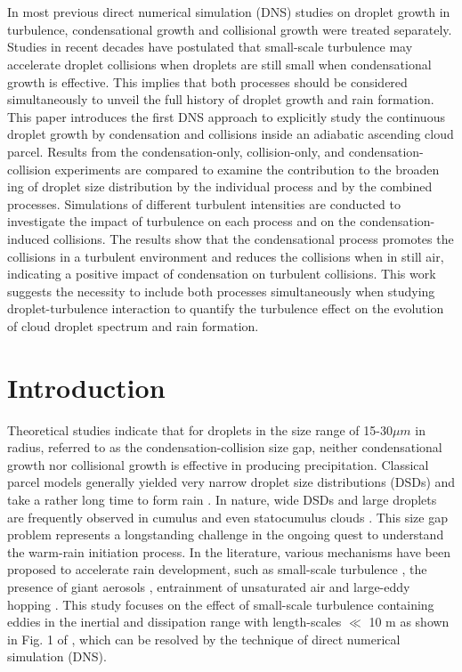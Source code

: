 \section*{}
In most previous direct numerical simulation (DNS) studies on droplet growth in turbulence, condensational growth and collisional growth were treated separately. Studies in recent decades have postulated that small-scale turbulence may accelerate droplet collisions when droplets are still small when condensational growth is effective. This implies that both processes should be considered simultaneously to unveil the full history of droplet growth and rain formation. This paper introduces the first DNS approach to explicitly study the continuous droplet growth by condensation and collisions inside an adiabatic ascending cloud parcel. Results from the condensation-only, collision-only, and condensation-collision experiments are compared to examine the contribution to the broaden	ing of droplet size distribution by the individual process and by the combined processes. Simulations of different turbulent intensities are conducted to investigate the impact of turbulence on each process and on the condensation-induced collisions. The results show that the condensational process promotes the collisions in a turbulent environment and reduces the collisions when in still air, indicating a positive impact of condensation on turbulent collisions. This work suggests the necessity to include both processes simultaneously when studying droplet-turbulence interaction to quantify the turbulence effect on the evolution of cloud droplet spectrum and rain formation.

\section{Introduction} \label{sec:ch4_intro}

Theoretical studies indicate that for droplets in the size range of 15-30$\mu m$ in radius, referred to as the condensation-collision size gap, neither condensational growth nor collisional growth is effective \citep{Pruppacher1997} in producing precipitation. Classical parcel models generally yielded very narrow droplet size distributions (DSDs) and take a rather long time to form rain \citep{Jonas1996}. In nature, wide DSDs and large droplets are frequently observed in cumulus and even statocumulus clouds \citep[e.g.,][]{BC2001,Pawlowska2006,Prabha2012}. This size gap problem represents a longstanding challenge in the ongoing quest to understand the warm-rain initiation process. In the literature, various mechanisms have been proposed to accelerate rain development, such as small-scale turbulence \citep{Vaillancourt2000}, the presence of giant aerosols \citep{johnson1982,blyth2003,Jensen2017}, entrainment of unsaturated air \citep{baker1980,lasher2005,cooper2013} and large-eddy hopping \citep{cooper1989,grabowski2017}. This study focuses on the effect of small-scale turbulence containing eddies in the inertial and dissipation range with length-scales $\ll$ 10 m as shown in Fig. 1 of \citet{Grabowski2013}, which can be resolved by the technique of direct numerical simulation (DNS). 

